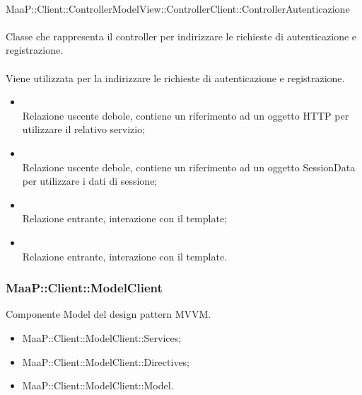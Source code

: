 \\
MaaP::Client::ControllerModelView::ControllerClient::ControllerAutenticazione\\
\\
Classe che rappresenta il controller per indirizzare le richieste di autenticazione e registrazione.\\
\\
Viene utilizzata per la indirizzare le richieste di autenticazione e registrazione.\\
\begin{itemize}
\item{}\\
Relazione uscente debole, contiene un riferimento ad un oggetto HTTP per utilizzare il relativo servizio;
\item{}\\
Relazione uscente debole, contiene un riferimento ad un oggetto SessionData per utilizzare i dati di sessione;
\item{}\\
Relazione entrante, interazione con il template;
\item{}\\
Relazione entrante, interazione con il template.
\end{itemize}
















\subsubsection{MaaP::Client::ModelClient}
Componente Model del design pattern MVVM.
\begin{itemize}
\item MaaP::Client::ModelClient::Services;
\item MaaP::Client::ModelClient::Directives;
\item MaaP::Client::ModelClient::Model.
\end{itemize}

